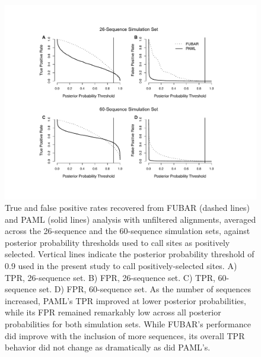 \documentclass[11pt]{article}
\begin{document}
\begin{figure}[H]
\centerline{\includegraphics[width=5in]{Figures/tprfpr.pdf}}
\caption{\label{tprfpr} True and false positive rates recovered from FUBAR (dashed lines) and PAML (solid lines) analysis with unfiltered alignments, averaged across the 26-sequence and the 60-sequence simulation sets, against posterior probability thresholds used to call sites as positively selected. Vertical lines indicate the posterior probability threshold of 0.9 used in the present study to call positively-selected sites. A) TPR, 26-sequence set. B) FPR, 26-sequence set. C) TPR, 60-sequence set. D) FPR, 60-sequence set.  As the number of sequences increased, PAML's TPR improved at lower posterior probabilities, while its FPR remained remarkably low across all posterior probabilities for both simulation sets. While FUBAR's performance did improve with the inclusion of more sequences, its overall TPR behavior did not change as dramatically as did PAML's.}
\end{figure}

\bigskip
\end{document}
